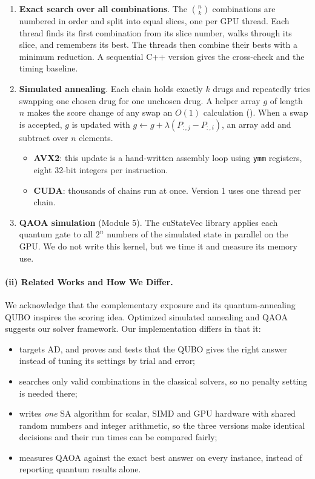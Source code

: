 \begin{enumerate}
\item \textbf{Exact search over all combinations}. The $\binom{n}{k}$ combinations are numbered in order and split into equal slices, one per GPU thread. Each thread finds its first combination from its slice number, walks through its slice, and remembers its best. The threads then combine their bests with a minimum reduction. A sequential C++ version gives the cross-check and the timing baseline.
\item \textbf{Simulated annealing}. Each chain holds exactly $k$ drugs and repeatedly tries swapping one chosen drug for one unchosen drug. A helper array $g$ of length $n$ makes the score change of any swap an $O(1)$ calculation (). When a swap is accepted, $g$ is updated with $g \leftarrow g + \lambda(P_{:,j}-P_{:,i})$, an array add and subtract over $n$ elements.
\begin{itemize}
\item \textbf{AVX2}: this update is a hand-written assembly loop using \texttt{ymm} registers, eight 32-bit integers per instruction.
\item \textbf{CUDA}: thousands of chains run at once. Version 1 uses one thread per chain.
\end{itemize}
\item \textbf{QAOA simulation} (Module 5). The cuStateVec library applies each quantum gate to all $2^n$ numbers of the simulated state in parallel on the GPU. We do not write this kernel, but we time it and measure its memory use.
\end{enumerate}

\paragraph{(ii) Related Works and How We Differ.} We acknowledge that the complementary exposure \cite{cheng2019combinations} and its quantum-annealing QUBO \cite{ramos2025quantum} inspires the scoring idea. Optimized simulated annealing \cite{isakov2015optimised} and QAOA \cite{farhi2014qaoa} suggests our solver framework. Our implementation differs in that it:
\begin{itemize}
\item targets AD, and proves and tests that the QUBO gives the right answer instead of tuning its settings by trial and error;
\item searches only valid combinations in the classical solvers, so no penalty setting is needed there;
\item writes \emph{one} SA algorithm for scalar, SIMD and GPU hardware with shared random numbers and integer arithmetic, so the three versions make identical decisions and their run times can be compared fairly;
\item measures QAOA against the exact best answer on every instance, instead of reporting quantum results alone.
\end{itemize}

